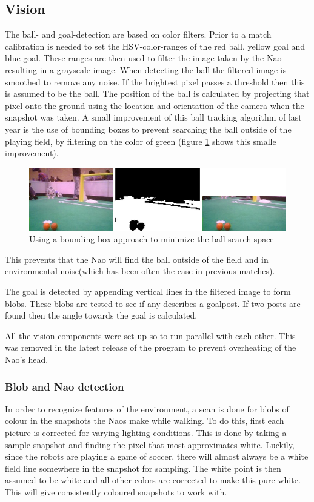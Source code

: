 \documentclass[11pt,a4paper,oneside]{article}
\begin{document}
\subsection{Vision}
\label{sec:vision}
The ball- and goal-detection are based on color filters. Prior to a match calibration is needed to set the HSV-color-ranges of the red ball, yellow goal and blue goal. These ranges are then used to filter the image taken by the Nao resulting in a grayscale image. When detecting the ball the filtered image is smoothed to remove any noise. If the brightest pixel passes a threshold then this is assumed to be the ball. The position of the ball is calculated by projecting that pixel onto the ground using the location and orientation of the camera when the snapshot was taken. A small improvement of this ball tracking algorithm of last year is the use of bounding boxes to prevent searching the ball outside of the playing field, by filtering on the color of green (figure \ref{fig:boundbox_ball} shows this smalle improvement). 

\begin{figure}[htb]    	
\centering
\includegraphics[width=0.8\columnwidth]{boundbox.png} %
\caption{Using a bounding box approach to minimize the ball search space} %
\label{fig:boundbox_ball}
\end{figure}

This prevents that the Nao will find the ball outside of the field and in environmental noise(which has been often the case in previous matches).

The goal is detected by appending vertical lines in the filtered image to form blobs. These blobs are tested to see if any describes a goalpost. If two posts are found then the angle towards the goal is calculated.

All the vision components were set up so to run parallel with each other. This was removed in the latest release of the program to prevent overheating of the Nao's head.  

\subsubsection{Blob and Nao detection}
In order to recognize features of the environment, a scan is done for blobs of colour in the snapshots the Naos make while walking. To do this, first each picture is corrected for varying lighting conditions. This is done by taking a sample snapshot and finding the pixel that most approximates white. Luckily, since the robots are playing a game of soccer, there will almost always be a white field line somewhere in the snapshot for sampling. The white point is then assumed to be white and all other colors are corrected to make this pure white. This will give consistently coloured snapshots to work with.
\end{document}
